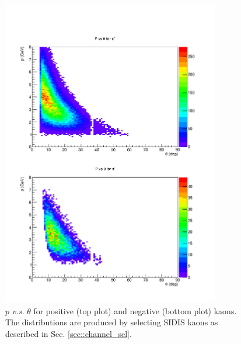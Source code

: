 %
%
\begin{figure}
\centering
\includegraphics[width=0.85\textwidth]{sidis/kaon_p_theta.pdf}
\caption{\label{fig::kaon_p_theta} $p$ \textit{v.s.} $\theta$ for positive (top plot) and negative (bottom plot) kaons. The distributions are produced by selecting SIDIS kaons as described in Sec. \ref{sec::channel_sel}.}
\end{figure}
%
%

